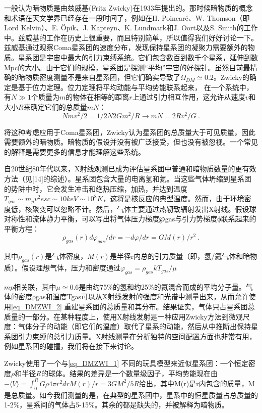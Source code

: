 

一般认为暗物质是由兹威基(Fritz Zwicky)在1933年提出的。那时候暗物质的概念和术语在天文学界已经存在一段时间了，例如在H. Poincaré、W. Thomson（即Lord Kelvin）、E. Öpik、J. Kapteyn、K. Lundmark和J. Oort以及S. Smith的工作中。兹威基的工作在历史上很重要，而且特别简单，所以值得我们好好讨论一下。兹威基通过观察Coma星系团的速度分布，发现保持星系团的凝聚力需要额外的物质。星系团是宇宙中最大的引力束缚系统。它们包含数百到数千个星系，延伸到数Mpc的大小。由于它们的规模，星系团是探测“平均”宇宙的好探针。虽然目前最精确的暗物质密度测量不是来自星系团，但它们确实导致了$\Omega_{DM} \simeq 0.2$。Zwicky的确定是基于位力定理。位力定理将平均动能与平均势能联系起来，%
在一个系统中，有$N \gg 1$个质量为$m$的物体在相等的距离$r$上通过引力相互作用，这允许从速度$v$和大小$R$来确定它们的总质量$mN$：
\begin{equation}\label{eq_DMZWI_1}
N mv^2 / 2 = 1/2 N2 G m^2 / R \rightarrow mN = 2R v^2 / G  ~.
\end{equation}


将这种考虑应用于Coma星系团，Zwicky认为星系团的总质量大于可见质量，因此需要额外的暗物质。暗物质的假设并没有被广泛接受，但也没有被忽视。一个常见的解释是需要更多的信息才能理解这些系统。

自20世纪80年代以来，X射线观测已成为评估星系团中普通和暗物质数量的更有效方法（见[14]的综述）。星系团包含大量的电离氢和氦。当这些气体坍缩到星系团的势阱中时，它会发生冲击和绝热压缩，加热，并达到温度$T_{gas} \sim m_pv^2 esc \sim 10 keV \sim  10^8 K$，这将是核反应的典型温度。然而，由于环境密度低，核聚变可以忽略不计。然后，气体主要通过热轫致辐射发出X射线。假设球对称性和流体静力平衡，可以写出将气体压力梯度℘gas与引力势梯度ϕ联系起来的平衡方程：
\begin{equation}\label{eq_DMZWI_2}
\rho_{gas}(r) d\varphi_{gas}/dr = - d\varphi / dr = GM(r)/ r^2~. 
\end{equation}
 

其中$\rho_{gas}(r)$是气体密度，$M(r)$是半径r内总的引力质量（即，氢/氦气体和暗物质）。假设理想气体，压力和密度通过$\varphi_{gas} = \rho_{gas}kT_{gas}/\mu$

$mp$相关联，其中$\mu\simeq 0.6$是由约75\%的氢和约25\%的氦混合而成的平均分子量。气体的密度ρgas和温度Tgas可以从X射线发射的强度和光谱中测量出来，从而允许使用\autoref{eq_DMZWI_2} 重建星系团的总质量和其分布。结果证实，气体只占星系团总质量的一部分。在某种程度上，使用X射线发射是一种应用Zwicky方法到微观尺度：气体分子的动能（即它们的温度）取代了星系的动能，然后从中推断出保持星系团引力束缚的总引力质量。X射线测量在分析独特的空间配置方面也非常有用，例如星系团的碰撞，我们将在接下来讨论。

Zwicky使用了一个与\autoref{eq_DMZWI_1} 不同的玩具模型来近似星系团：一个恒定密度$\rho$和半径$R$的球体。结果的差异是一个数量级因子，平均势能现在由$-\langle V\rangle = \int^R_0 G \rho 4\pi r^2 dr M(r)/r = 3GM^2/5 R$给出，其中M(r)是r内包含的质量，M是总质量。如今我们测量的是，在典型的星系团中，星系中的恒星质量占总质量的1-2\%，星系间的气体占5-15\%。其余的都是缺失的，并被解释为暗物质。